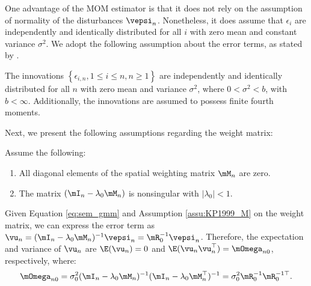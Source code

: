 \documentclass[english,12pt]{book}\usepackage[]{graphicx}\usepackage[]{xcolor}
\begin{document}
One advantage of the MOM estimator is that it does not rely on the assumption of normality of the disturbances $\vepsi_n$. Nonetheless, it does assume that $\epsilon_i$ are independently and identically distributed for all $i$ with zero mean and constant variance $\sigma^2$. We adopt the following assumption about the error terms, as stated by \cite{kelejian1999generalized}.

\begin{assumption}\label{assu:errors_triang_homokedastic}
The innovations $\left\lbrace \epsilon_{i,n}, 1 \leq i \leq n, n\geq 1\right\rbrace$ are independently and identically distributed for all $n$ with zero mean and variance $\sigma^2$, where $0 < \sigma^2 < b$, with $b < \infty$. Additionally, the innovations are assumed to possess finite fourth moments. 
\end{assumption}

Next, we present the following assumptions regarding the weight matrix:

\begin{assumption}\label{assu:KP1999_M} Assume the following:
\begin{enumerate}
  \item All diagonal elements of the spatial weighting matrix $\mM_n$ are zero.
  \item The matrix $(\mI_n - \lambda_0\mM_n)$ is nonsingular with $\left|\lambda_0 \right|<1$.
\end{enumerate}
\end{assumption}

Given Equation \eqref{eq:sem_gmm}  and Assumption \ref{assu:KP1999_M} on the weight matrix, we can express the error term as $\vu_n = (\mI_n - \lambda_0 \mM_n)^{-1}\vepsi_n = \mR_0^{-1}\vepsi_n$. Therefore, the expectation and variance of $\vu_n$ are $\E(\vu_n) = 0$ and $\E(\vu_n\vu^\top_n) = \mOmega_{n0}$, respectively, where:
\begin{equation*}
  \mOmega_{n0} = \sigma^2_{0}(\mI_n - \lambda_0\mM_n)^{-1}(\mI_n - \lambda_0\mM_n^\top)^{-1} = \sigma_{0}^2\mR_0^{-1}\mR_0^{-1\top}.
\end{equation*}
\end{document}
